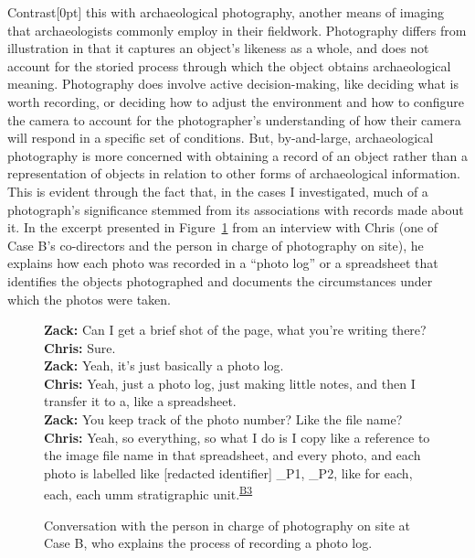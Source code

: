 \documentclass[
]{article}
\newcommand{\paragraphnumber}[1]{\marginnote{\color{lightgray}\tiny{#1}}[0pt]}
\begin{document}
Contrast\paragraphnumber{[55]} this with archaeological photography,
another means of imaging that archaeologists commonly employ in their
fieldwork. Photography differs from illustration in that it captures an
object's likeness as a whole, and does not account for the storied
process through which the object obtains archaeological meaning.
Photography does involve active decision-making, like deciding what is
worth recording, or deciding how to adjust the environment and how to
configure the camera to account for the photographer's understanding of
how their camera will respond in a specific set of conditions. But,
by-and-large, archaeological photography is more concerned with
obtaining a record of an object rather than a representation of objects
in relation to other forms of archaeological information. This is
evident through the fact that, in the cases I investigated, much of a
photograph's significance stemmed from its associations with records
made about it. In the excerpt presented in
Figure~\ref{fig-photolog-convo} from an interview with Chris (one of
Case B's co-directors and the person in charge of photography on site),
he explains how each photo was recorded in a ``photo log'' or a
spreadsheet that identifies the objects photographed and documents the
circumstances under which the photos were taken.

\begin{figure}

\begin{minipage}{\linewidth}
\textbf{Zack:} Can I get a brief shot of the page, what you're writing
there?\\
\textbf{Chris:} Sure.\\
\textbf{Zack:} Yeah, it's just basically a photo log.\\
\textbf{Chris:} Yeah, just a photo log, just making little notes, and
then I transfer it to a, like a spreadsheet.\\
\textbf{Zack:} You keep track of the photo number? Like the file name?\\
\textbf{Chris:} Yeah, so everything, so what I do is I copy like a
reference to the image file name in that spreadsheet, and every photo,
and each photo is labelled like {[}redacted identifier{]} \_P1, \_P2,
like for each, each, each umm stratigraphic
unit.\textsuperscript{\hyperref[sec-B3]{B3}}\end{minipage}%

\caption{\label{fig-photolog-convo}Conversation with the person in
charge of photography on site at Case B, who explains the process of
recording a photo log.}

\end{figure}%
\end{document}
